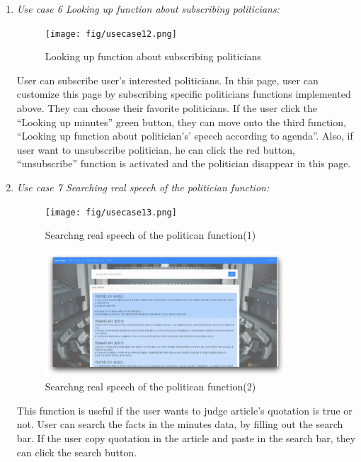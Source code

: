 \documentclass[conference]{IEEEtran}
\begin{document}
\begin{enumerate}
\vspace{100mm}



\item \textit{Use case 6 Looking up function about subscribing politicians:}

\begin{figure}[htbp]
\centerline{\texttt{[image: fig/usecase12.png]}}
\caption{Looking up function about subscribing politicians}
\label{fig}
\end{figure}




 User can subscribe user’s interested politicians. In this page, user can customize this page by subscribing specific politicians functions implemented above. They can choose their favorite politicians. If the user click the “Looking up minutes” green button,  they can move onto the third function, “Looking up  function about politician’s' speech according to agenda”. Also, if user want to unsubscribe politician, he can click the red button, “unsubscribe” function is activated and the politician disappear in this page.\\

\clearpage
 \item \textit{Use case 7 Searching real speech of the politician function:} 
 
 \begin{figure}[htbp]
\centerline{\texttt{[image: fig/usecase13.png]}}
\caption{Searchng real speech of the politican function(1)}
\label{fig}
\end{figure}


  \begin{figure}[htbp]
\centerline{\includegraphics[width=90mm,scale=0.5]{fig/usecase14.png}}
\caption{Searchng real speech of the politican function(2)}
\label{fig}
\end{figure}
 
 This function is useful if the user wants to judge article’s quotation is true or not. User can search the facts in the minutes data, by filling out the search bar. If the user copy quotation in the article and paste in the search bar, they can click the search button. \
 

\end{enumerate}
\end{document}
